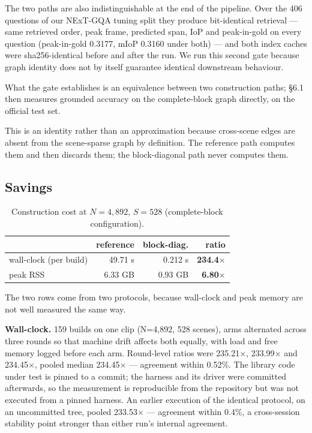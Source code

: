 \documentclass[sigconf,review,anonymous]{acmart}
\begin{document}
The two paths are also indistinguishable at the end of the pipeline. Over the 406 questions
of our NExT-GQA tuning split they produce bit-identical retrieval --- same retrieved order,
peak frame, predicted span, IoP and peak-in-gold on every question (peak-in-gold 0.3177, mIoP
0.3160 under both) --- and both index caches were sha256-identical before and after the
run. We run this second gate because graph identity does not by itself guarantee identical
downstream behaviour.

What the gate establishes is an equivalence between two construction paths; §6.1 then
measures grounded accuracy on the complete-block graph directly, on the official test set.

This is an identity rather than an approximation because cross-scene edges are absent from
the scene-sparse graph by definition. The reference path computes them and then discards
them; the block-diagonal path never computes them.

\subsection{Savings}

\begin{table}[t]
\footnotesize
\setlength{\tabcolsep}{4pt}
\caption{Construction cost at $N=4{,}892$, $S=528$ (complete-block configuration).}
\begin{tabular}{lrrr}
\toprule
 & reference & block-diag. & ratio \\
\midrule
wall-clock (per build) & 49.71 s & 0.212 s & \textbf{234.4\ensuremath{\times}} \\
peak RSS & 6.33 GB & 0.93 GB & \textbf{6.80\ensuremath{\times}} \\
\bottomrule
\end{tabular}
\end{table}

The two rows come from two protocols, because wall-clock and peak memory are not well
measured the same way.

\textbf{Wall-clock.} 159 builds on one clip (N=4,892, 528 scenes), arms alternated across three
rounds so that machine drift affects both equally, with load and free memory logged before
each arm. Round-level ratios were 235.21\ensuremath{\times}, 233.99\ensuremath{\times} and 234.45\ensuremath{\times}, pooled median 234.45\ensuremath{\times} ---
agreement within 0.52\%. The library code under test is pinned to a commit; the harness and its
driver were committed afterwards, so the measurement is reproducible from the
repository but was not executed from a pinned harness. An earlier execution of the identical
protocol, on an uncommitted tree, pooled 233.53\ensuremath{\times} --- agreement within 0.4\%, a cross-session
stability point stronger than either run's internal agreement.
\end{document}
